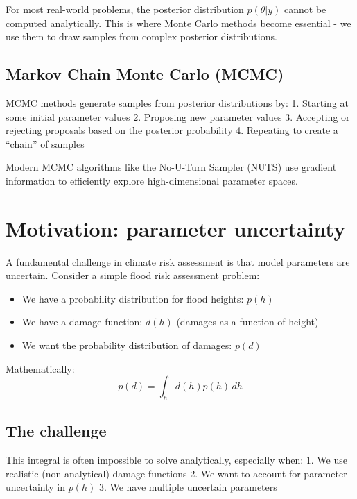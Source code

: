 \documentclass[
  letterpaper,
  DIV=11,
  numbers=noendperiod]{scrreprt}
\providecommand{\tightlist}{%
  \setlength{\itemsep}{0pt}\setlength{\parskip}{0pt}}
\begin{document}
For most real-world problems, the posterior distribution
\(p(\theta | y)\) cannot be computed analytically. This is where Monte
Carlo methods become essential - we use them to draw samples from
complex posterior distributions.

\subsection{Markov Chain Monte Carlo
(MCMC)}\label{markov-chain-monte-carlo-mcmc}

MCMC methods generate samples from posterior distributions by: 1.
Starting at some initial parameter values 2. Proposing new parameter
values 3. Accepting or rejecting proposals based on the posterior
probability 4. Repeating to create a ``chain'' of samples

Modern MCMC algorithms like the No-U-Turn Sampler (NUTS) use gradient
information to efficiently explore high-dimensional parameter spaces.

\section{Motivation: parameter
uncertainty}\label{motivation-parameter-uncertainty}

A fundamental challenge in climate risk assessment is that model
parameters are uncertain. Consider a simple flood risk assessment
problem:

\begin{itemize}
\tightlist
\item
  We have a probability distribution for flood heights: \(p(h)\)
\item
  We have a damage function: \(d(h)\) (damages as a function of height)
\item
  We want the probability distribution of damages: \(p(d)\)
\end{itemize}

Mathematically: \[
p(d) = \int_h d(h) p(h) \, dh
\]

\subsection{The challenge}\label{the-challenge-1}

This integral is often impossible to solve analytically, especially
when: 1. We use realistic (non-analytical) damage functions 2. We want
to account for parameter uncertainty in \(p(h)\) 3. We have multiple
uncertain parameters
\end{document}
